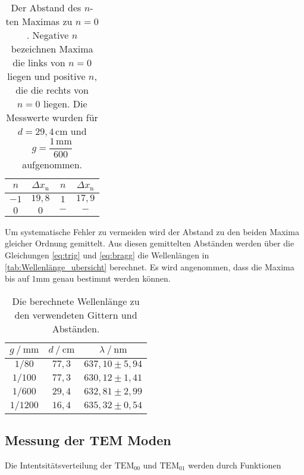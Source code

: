 \begin{table}[H]
    \centering
    \caption{Der Abstand des $n$-ten Maximas zu $n = 0$. Negative $n$ bezeichnen Maxima die links von $n = 0$ liegen und positive $n$, die die rechts von $n = 0$ liegen. Die Messwerte wurden für $d = 29,4 \, \unit{\centi\meter}$ und $g = \dfrac{1 \, \unit{\milli\meter}}{600}$ aufgenommen.}
    \label{tab:Well_1600}
    \begin{tabular}{c c c c}
    \toprule
     $n$ & $\Delta x_\text{n}$ &   $n$ & $\Delta x_\text{n}$\\
    \midrule
    $-1$ & $19,8$   & $1$ & $ 17,9$   \\
    $0$  & $0   $   & $-$ & $ -   $   \\
    \bottomrule
    \end{tabular}
    \end{table}

Um systematische Fehler zu vermeiden wird der Abstand zu den beiden Maxima gleicher Ordnung gemittelt. 
Aus diesen gemittelten Abständen werden über die Gleichungen \eqref{eq:trig} und \eqref{eq:bragg} die Wellenlängen in \autoref{tab:Wellenlänge_ubersicht} berechnet. 
Es wird angenommen, dass die Maxima bis auf $1 \unit{\milli\meter}$ genau bestimmt werden können.

\begin{table}[H]
    \centering
    \caption{Die berechnete Wellenlänge zu den verwendeten Gittern und Abständen.}
    \label{tab:Wellenlänge_ubersicht}
    \begin{tabular}{c c c}
    \toprule
     $g \mathbin{/} \unit{\milli\meter}$ & $d \mathbin{/} \unit{\centi\meter}$ &$\lambda \mathbin{/} \unit{\nano\meter}$ \\
    \midrule
    $1/80  $   & $77,3$   & $637,10 \pm 5,94$\\
    $1/100 $   & $77,3$   & $630,12 \pm 1,41$\\
    $1/600 $   & $29,4$   & $632,81 \pm 2,99$\\
    $1/1200$   & $16,4$   & $635,32 \pm 0,54$\\
    \bottomrule
    \end{tabular}
    \end{table}

\subsection{Messung der TEM Moden}
\label{sec:TEM_moden}

Die Intentsitätsverteilung der $\text{TEM}_{00}$ und $\text{TEM}_{01}$  werden durch Funktionen 

